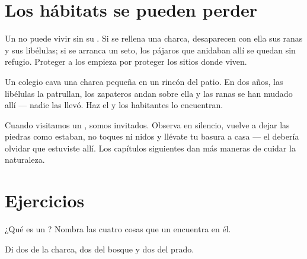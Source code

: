 \section{Los hábitats se pueden perder}

\begin{proposition}\label{prop:g2:where-animals-live:loss}
Un  no puede vivir sin su . Si se rellena una charca,
desaparecen con ella sus ranas y sus libélulas; si se arranca un seto,
los pájaros que anidaban allí se quedan sin refugio. Proteger a los
 empieza por proteger los sitios donde viven.
\end{proposition}
\admitted

\begin{example}\label{ex:g2:where-animals-live:schoolpond}
Un colegio cava una charca pequeña en un rincón del patio. En dos
años, las libélulas la patrullan, los zapateros andan sobre ella y las
ranas se han mudado allí --- nadie las llevó. Haz el  y los
habitantes lo encuentran.
\end{example}

\begin{remark}\label{rem:g2:where-animals-live:respect}
Cuando visitamos un , somos invitados. Observa en silencio,
vuelve a dejar las piedras como estaban, no toques  ni nidos y
llévate tu basura a casa --- el  debería olvidar que estuviste
allí. Los capítulos siguientes dan más maneras de cuidar la naturaleza.
\end{remark}

\section{Ejercicios}

\begin{exercise}[$\star$]\label{exo:g2:where-animals-live:1}
¿Qué es un ? Nombra las cuatro cosas que un  encuentra en él.
\end{exercise}

\begin{exercise}[$\star$]\label{exo:g2:where-animals-live:2}
Di dos  de la charca, dos del bosque y dos del prado.
\end{exercise}

